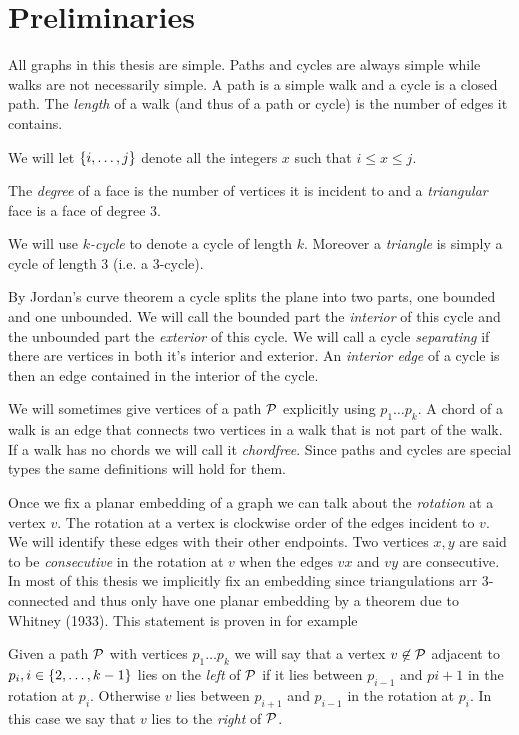 
\section{Preliminaries}
All graphs in this thesis are simple. Paths and cycles are always simple while walks are not necessarily simple. A path is a simple walk and a cycle is a closed path.
The \emph{length} of a walk (and thus of a path or cycle) is the number of edges it contains.

We will let $\braces {i, \ldots, j}$ denote all the integers $x$ such that $i \leq x \leq j$.

The \emph{degree} of a face is the number of vertices it is incident to and a \emph{triangular} face is a face of degree $3$.

We will use \emph{$k$-cycle} to denote a cycle of length $k$. Moreover a \emph{triangle} is simply a cycle of length $3$ (i.e. a $3$-cycle).

By Jordan's curve theorem a cycle splits the plane into two parts, one bounded and one unbounded. We will call the bounded part the \emph{interior} of this cycle and the unbounded part the \emph{exterior} of this cycle.
We will call a cycle \emph{separating} if there are vertices in both it's interior and exterior.
An \emph{interior edge} of a cycle is then an edge contained in the interior of the cycle.


We will sometimes give vertices of a path $\P$ explicitly using $p_1 \ldots p_k$. A chord of a walk is an edge that connects two vertices in a walk that is not part of the walk. If a walk has no chords we will call it \emph{chordfree}. Since paths and cycles are special types the same definitions will hold for them.

Once we fix a planar embedding of a graph we can talk about the \emph{rotation} at a vertex $v$. The rotation at a vertex is clockwise order of the edges incident to $v$. We will identify these edges with their other endpoints. Two vertices $x, y$ are said to be \emph{consecutive} in the rotation at $v$ when the edges $vx$ and $vy$ are consecutive. In most of this thesis we implicitly fix an embedding since triangulations arr 3-connected and thus only have one planar embedding by a theorem due to Whitney (1933). This statement is proven in for example \cite[p. 267]{Bondy2008}

Given a path $\P$ with vertices $p_1 \ldots p_k$ we will say that a vertex $v \nin \P$ adjacent to $p_i, i \in \braces{2, \ldots, k-1}$ lies on the \emph{left} of $\P$ if it lies between $p_{i-1}$ and $p{i+1}$ in the rotation at $p_{i}$. Otherwise $v$ lies between $p_{i+1}$ and $p_{i-1}$ in the
rotation at $p_i$. In this case we say that $v$ lies to the \emph{right} of $\P$.

